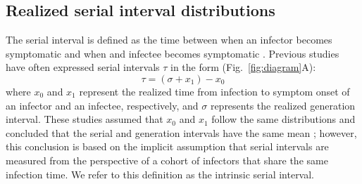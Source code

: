 \documentclass[12pt]{article}
\newcommand{\fref}[1]{Fig.~\ref{fig:#1}}
\newcommand{\gtime}{\sigma} %
\begin{document}
\subsection{Realized serial interval distributions}

The serial interval is defined as the time between when an infector becomes symptomatic and when and infectee becomes symptomatic \citep{svensson2007note}.
Previous studies have often expressed serial intervals $\tau$ in the form (\fref{diagram}A):
\begin{equation}
\tau = (\gtime + x_1) - x_0
\end{equation}
where $x_0$ and $x_1$ represent the realized time from infection to symptom onset of an infector and an infectee, respectively, and $\gtime$ represents the realized generation interval.
These studies assumed that $x_0$ and $x_1$ follow the same distributions and concluded that the serial and generation intervals have the same mean \citep{svensson2007note,klinkenberg2011correlation,champredon2018equivalence, britton2019estimation};
however, this conclusion is based on the implicit assumption that serial intervals are measured from the perspective of a cohort of infectors that share the same infection time.
We refer to this definition as the intrinsic serial interval.
\end{document}
